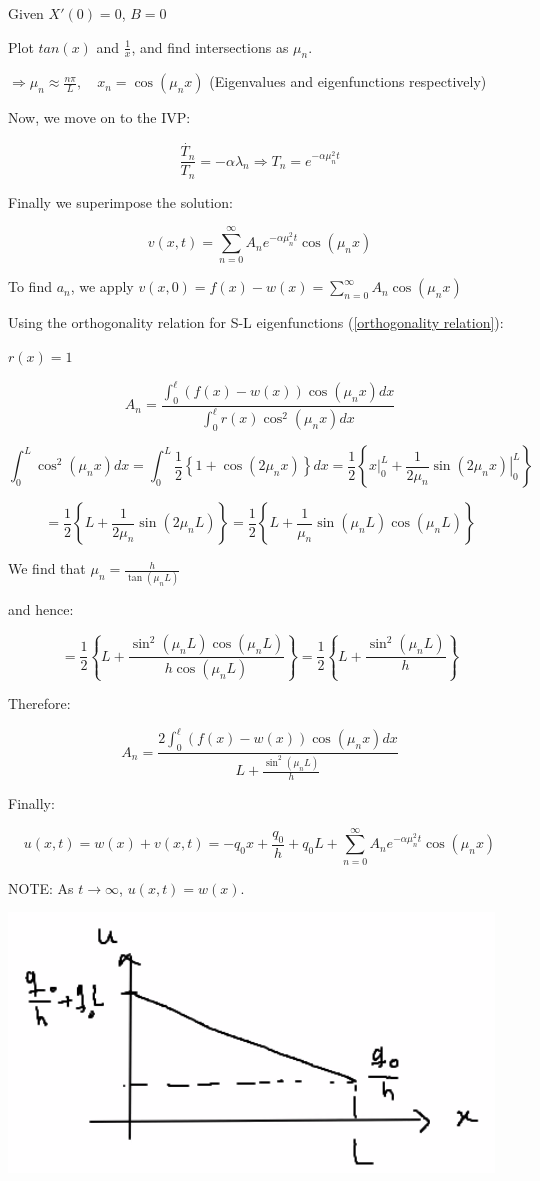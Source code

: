 \documentclass{article}
\begin{document}
Given $X'(0) = 0$, $B = 0$

Plot $tan(x)$ and $\frac{1}{x}$, and find intersections as $\mu_n$. 

$\Rightarrow \mu_n \approx \frac{n \pi}{L}, \quad x_n = \cos(\mu_n x)$ (Eigenvalues and eigenfunctions respectively)

\hfill

Now, we move on to the IVP:

$$\frac{\dot{T_n}}{T_n} = - \alpha \lambda_n \Rightarrow T_n = e^{- \alpha \mu_n^2 t}$$

Finally we superimpose the solution:

$$v(x,t) = \sum_{n=0}^\infty A_n e^{- \alpha \mu_n^2 t} \cos(\mu_n x)$$

To find $a_n$, we apply $v(x,0) = f(x) - w(x) = \sum_{n=0}^\infty A_n \cos(\mu_n x)$

Using the orthogonality relation for S-L eigenfunctions (\ref{orthogonality relation}):

$r(x) = 1$

$$A_n = \frac{\int_0^\ell (f(x) - w(x)) \cos(\mu_n x) dx}{\int_0^\ell r(x) \cos^2 (\mu_n x) dx}$$

$$\int_0^L \cos^2 (\mu_n x) dx = \int_0^L \frac{1}{2} \left\{ 1 + \cos(2 \mu_n x) \right\} dx = \frac{1}{2} \left\{ \left. x \right|_0^L + \frac{1}{2 \mu_n} \left. \sin \left( 2 \mu_n x \right) \right|_0^L \right\}$$

$$ = \frac{1}{2} \left\{ L + \frac{1}{2 \mu_n} \sin(2 \mu_n L) \right\} = \frac{1}{2} \left\{ L + \frac{1}{\mu_n} \sin(\mu_n L) \cos(\mu_n L) \right\}$$

We find that $\mu_n = \frac{h}{\tan(\mu_n L)}$

and hence:

$$= \frac{1}{2} \left\{ L + \frac{\sin^2 (\mu_n L) \cos(\mu_n L)}{h \cos(\mu_n L)} \right\} = \frac{1}{2} \left\{ L + \frac{\sin^2 (\mu_n L)}{h} \right\}$$

Therefore:

$$A_n = \frac{2 \int_0^\ell (f(x) - w(x)) \cos(\mu_n x) dx}{L + \frac{\sin^2(\mu_n L)}{h}}$$

Finally:

$$u(x,t) = w(x) + v(x,t) = - q_0 x + \frac{q_0}{h} + q_0 L + \sum_{n=0}^\infty A_n e^{- \alpha \mu_n^2 t} \cos (\mu_n x)$$

NOTE: As $t \to \infty$, $u(x,t) = w(x)$. 

\begin{center}
    \includegraphics[width = 0.6 \textwidth]{3.png}
\end{center}
\end{document}
